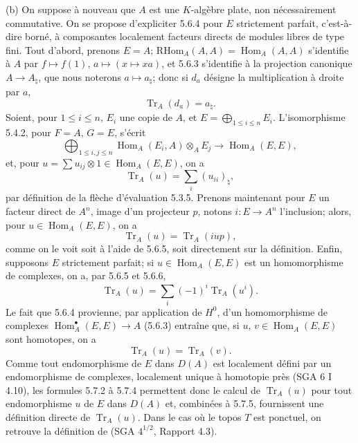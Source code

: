 \documentclass[11pt]{article}
\DeclareMathOperator{\Hom}{Hom}
\providecommand{\RHom}{\mathrm{RHom}}
\providecommand{\Tr}{\operatorname{Tr}}
\providecommand{\Tr}{\operatorname{Tr}}
\providecommand{\Tr}{\operatorname{Tr}}
\providecommand{\RHom}{\mathrm{RHom}}
\providecommand{\Hom}{\operatorname{Hom}}
\providecommand{\RHom}{\mathrm R\mathcal{H}om}
\providecommand{\Tr}{\operatorname{Tr}}
\providecommand{\RHom}{\mathrm{RHom}}
\providecommand{\Hom}{\operatorname{Hom}}
\providecommand{\Tr}{\operatorname{Tr}}
\begin{document}
(b) On suppose à nouveau que $A$ est une $K$-algèbre plate, non nécessairement commutative. On se propose d'expliciter 5.6.4 pour $E$ strictement parfait, c'est-à-dire borné, à composantes localement facteurs directs de modules libres de type fini. Tout d'abord, prenons $E=A$; $\RHom_A(A,A)=\Hom_A(A,A)$ s'identifie à $A$ par $f\mapsto f(1)$, $a\mapsto(x\mapsto xa)$, et 5.6.3 s'identifie à la projection canonique $A\to A_\natural$, que nous noterons $a\mapsto a_\natural$; donc si $d_a$ désigne la multiplication à droite par $a$,
\begin{equation}\tag{5.7.1}
\Tr_A(d_a)=a_\natural.
\end{equation}
Soient, pour $1\le i\le n$, $E_i$ une copie de $A$, et $E=\bigoplus_{1\le i\le n}E_i$. L'isomorphisme 5.4.2, pour $F=A$, $G=E$, s'écrit
\[
\bigoplus_{1\le i,j\le n}\Hom_A(E_i,A)\otimes_AE_j\longrightarrow\Hom_A(E,E),
\]
et, pour $u=\sum u_{ij}\otimes 1\in\Hom_A(E,E)$, on a
\begin{equation}\tag{5.7.2}
\Tr_A(u)=\sum_i (u_{ii})_\natural,
\end{equation}
par définition de la flèche d'évaluation 5.3.5. Prenons maintenant pour $E$ un facteur direct de $A^n$, image d'un projecteur $p$, notons $i:E\to A^n$ l'inclusion; alors, pour $u\in\Hom_A(E,E)$, on a
\begin{equation}\tag{5.7.3}
\Tr_A(u)=\Tr_A(iup),
\end{equation}
comme on le voit soit à l'aide de 5.6.5, soit directement sur la définition. Enfin, supposons $E$ strictement parfait; si $u\in\Hom_A(E,E)$ est un homomorphisme de complexes, on a, par 5.6.5 et 5.6.6,
\begin{equation}\tag{5.7.4}
\Tr_A(u)=\sum_i(-1)^i\Tr_A(u^i).
\end{equation}
Le fait que 5.6.4 provienne, par application de $H^0$, d'un homomorphisme de complexes $\Hom_A^\bullet(E,E)\to A$ (5.6.3) entraîne que, si $u$, $v\in\Hom_A(E,E)$ sont homotopes, on a
\begin{equation}\tag{5.7.5}
\Tr_A(u)=\Tr_A(v).
\end{equation}
Comme tout endomorphisme de $E$ dans $D(A)$ est localement défini par un endomorphisme de complexes, localement unique à homotopie près (SGA 6 I 4.10), les formules 5.7.2 à 5.7.4 permettent donc le calcul de $\Tr_A(u)$ pour tout endomorphisme $u$ de $E$ dans $D(A)$ et, combinées à 5.7.5, fournissent une définition directe de $\Tr_A(u)$. Dans le cas où le topos $T$ est ponctuel, on retrouve la définition de (SGA $4^{1/2}$, Rapport 4.3).
\end{document}
